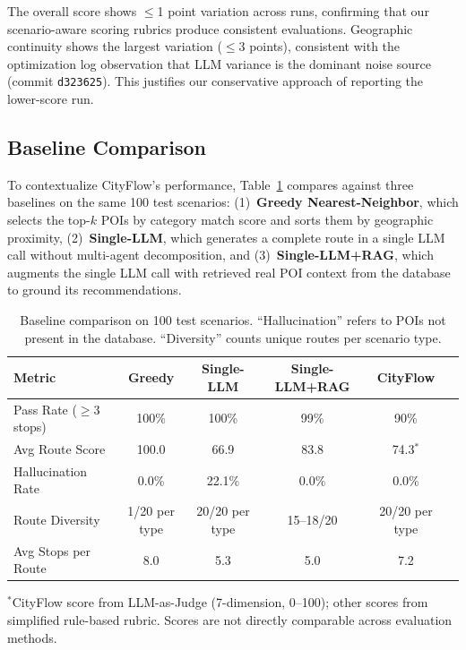 The overall score shows $\leq$1 point variation across runs, confirming that our scenario-aware scoring rubrics produce consistent evaluations. Geographic continuity shows the largest variation ($\leq$3 points), consistent with the optimization log observation that LLM variance is the dominant noise source (commit \texttt{d323625}). This justifies our conservative approach of reporting the lower-score run.

\subsection{Baseline Comparison}
\label{sec:baseline_comparison}

To contextualize CityFlow's performance, Table~\ref{tab:baseline_compare} compares against three baselines on the same 100 test scenarios: (1)~\textbf{Greedy Nearest-Neighbor}, which selects the top-$k$ POIs by category match score and sorts them by geographic proximity, (2)~\textbf{Single-LLM}, which generates a complete route in a single LLM call without multi-agent decomposition, and (3)~\textbf{Single-LLM+RAG}, which augments the single LLM call with retrieved real POI context from the database to ground its recommendations.

\begin{table}[H]
\centering
\caption{Baseline comparison on 100 test scenarios. ``Hallucination'' refers to POIs not present in the database. ``Diversity'' counts unique routes per scenario type.}
\label{tab:baseline_compare}
\begin{tabular}{@{}lccccc@{}}
\toprule
\textbf{Metric} & \textbf{Greedy} & \textbf{Single-LLM} & \textbf{Single-LLM+RAG} & \textbf{CityFlow} \\
\midrule
Pass Rate ($\geq$3 stops) & 100\% & 100\% & 99\% & 90\% \\
Avg Route Score & 100.0 & 66.9 & 83.8 & 74.3$^{*}$ \\
Hallucination Rate & 0.0\% & 22.1\% & 0.0\% & 0.0\% \\
Route Diversity & 1/20 per type & 20/20 per type & 15--18/20 & 20/20 per type \\
Avg Stops per Route & 8.0 & 5.3 & 5.0 & 7.2 \\
\bottomrule
\end{tabular}
\vspace{2pt}
{\footnotesize $^{*}$CityFlow score from LLM-as-Judge (7-dimension, 0--100); other scores from simplified rule-based rubric. Scores are not directly comparable across evaluation methods.}
\end{table}

